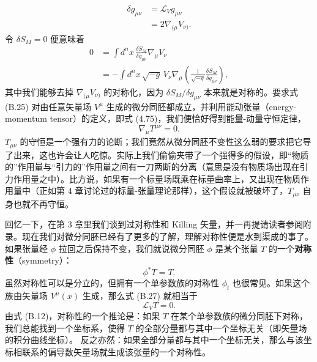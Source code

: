 \begin{align*}
\delta g_{\mu\nu} &= \mathcal{L}_V g_{\mu\nu} \\
&= 2 \nabla_{(\mu} V_{\nu)}. \tag{B.24}
\end{align*}
令 $\delta S_M = 0$ 便意味着
\begin{align*}
0 &= \int d^n x \, \frac{\delta S_M}{\delta g_{\mu\nu}} \nabla_\mu V_\nu \\
&= - \int d^n x \, \sqrt{-g} \, V_\nu \nabla_\mu \left( \frac{1}{\sqrt{-g}} \frac{\delta S_M}{\delta g_{\mu\nu}} \right), \tag{B.25}
\end{align*}
其中我们能够去掉 $\nabla_{(\mu} V_{\nu)}$ 的对称化，因为 $\delta S_M/\delta g_{\mu\nu}$ 本来就是对称的。要求式 (B.25) 对由任意矢量场 $V^\mu$ 生成的微分同胚都成立，并利用能动张量（energy-momentum tensor）的定义，即式 (4.75)，我们便恰好得到能量-动量守恒定律，
\begin{equation*}
\nabla_\mu T^{\mu\nu} = 0.
\tag{B.26}
\end{equation*}
$T_{\mu\nu}$ 的守恒是一个强有力的论断；我们竟然从微分同胚不变性这么弱的要求把它导了出来，这也许会让人吃惊。实际上我们偷偷夹带了一个强得多的假设，即“物质的”作用量与“引力的”作用量之间有一刀两断的分离（意思是没有物质场出现在引力作用量之中）。比方说，如果有一个标量场既乘在标量曲率上，又出现在物质作用量中（正如第 4 章讨论过的标量-张量理论那样），这个假设就被破坏了，$T_{\mu\nu}$ 自身也就不再守恒。

回忆一下，在第 3 章里我们谈到过对称性和 Killing 矢量，并一再提请读者参阅附录。现在我们对微分同胚已经有了更多的了解，理解对称性便是水到渠成的事了。如果张量经 $\phi$ 拉回之后保持不变，我们就说微分同胚 $\phi$ 是某个张量 $T$ 的一个\textbf{对称性}（symmetry）：
\begin{equation*}
\phi^* T = T.
\tag{B.27}
\end{equation*}
虽然对称性可以是分立的，但拥有一个单参数族的对称性 $\phi_t$ 也很常见。如果这个族由矢量场 $V^\mu(x)$ 生成，那么式 (B.27) 就相当于
\begin{equation*}
\mathcal{L}_V T = 0.
\tag{B.28}
\end{equation*}
由式 (B.12)，对称性的一个推论是：如果 $T$ 在某个单参数族的微分同胚下对称，我们总能找到一个坐标系，使得 $T$ 的全部分量都与其中一个坐标无关（即矢量场的积分曲线坐标）。%
反之亦然：如果全部分量都与其中一个坐标无关，那么与该坐标相联系的偏导数矢量场就生成该张量的一个对称性。

